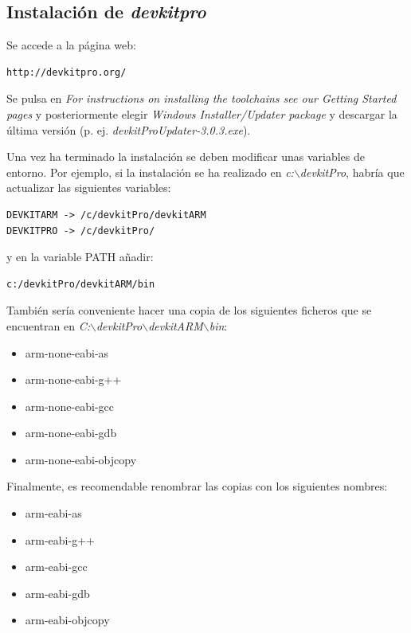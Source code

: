 \subsection{Instalación de \textit{devkitpro}}
Se accede a la página web:
\begin{verbatim}
http://devkitpro.org/
\end{verbatim}
Se pulsa en \textit{For instructions on installing the toolchains see our Getting Started pages} y posteriormente elegir \textit{Windows Installer/Updater package} y descargar la última versión (p. ej. \textit{devkitProUpdater-3.0.3.exe}). 

Una vez ha terminado la instalación se deben modificar unas variables de entorno. Por ejemplo, si la instalación se ha realizado en \textit{c:$\backslash$devkitPro}, habría que actualizar las siguientes variables:
\begin{verbatim}
DEVKITARM -> /c/devkitPro/devkitARM
DEVKITPRO -> /c/devkitPro/
\end{verbatim}

y en la variable PATH añadir:
\begin{verbatim}
c:/devkitPro/devkitARM/bin
\end{verbatim}

También sería conveniente hacer una copia de los siguientes ficheros que se encuentran en 
\textit{C:$\backslash$devkitPro$\backslash$devkitARM$\backslash$bin}:
\begin{itemize}
\item arm-none-eabi-as
\item arm-none-eabi-g++
\item arm-none-eabi-gcc
\item arm-none-eabi-gdb
\item arm-none-eabi-objcopy
\end{itemize}

Finalmente, es recomendable renombrar las copias con los siguientes nombres:
\begin{itemize}
\item arm-eabi-as
\item arm-eabi-g++
\item arm-eabi-gcc
\item arm-eabi-gdb
\item arm-eabi-objcopy
\end{itemize}
	

